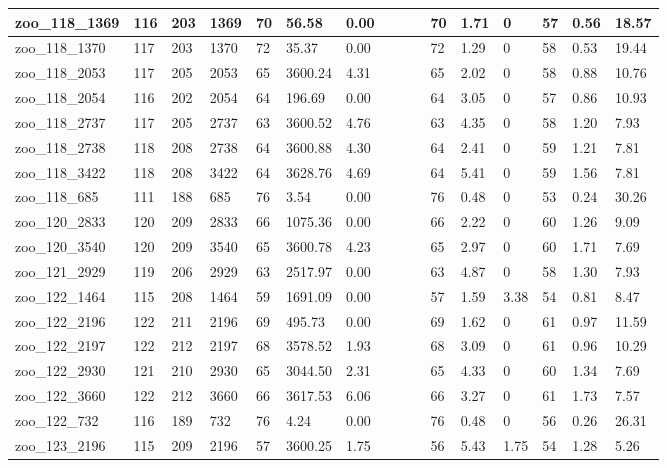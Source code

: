 \begin{landscape}
\begin{longtable}{llllllllllllllll}
zoo\_118\_1369 & 116 & 203 & 1369 & 70 & 56.58 & 0.00 &  &  &  & 70 & 1.71 & 0 & 57 & 0.56 & 18.57 \\ \hline 
zoo\_118\_1370 & 117 & 203 & 1370 & 72 & 35.37 & 0.00 &  &  &  & 72 & 1.29 & 0 & 58 & 0.53 & 19.44 \\ \hline 
zoo\_118\_2053 & 117 & 205 & 2053 & 65 & 3600.24 & 4.31 &  &  &  & 65 & 2.02 & 0 & 58 & 0.88 & 10.76 \\ \hline 
zoo\_118\_2054 & 116 & 202 & 2054 & 64 & 196.69 & 0.00 &  &  &  & 64 & 3.05 & 0 & 57 & 0.86 & 10.93 \\ \hline 
zoo\_118\_2737 & 117 & 205 & 2737 & 63 & 3600.52 & 4.76 &  &  &  & 63 & 4.35 & 0 & 58 & 1.20 & 7.93 \\ \hline 
zoo\_118\_2738 & 118 & 208 & 2738 & 64 & 3600.88 & 4.30 &  &  &  & 64 & 2.41 & 0 & 59 & 1.21 & 7.81 \\ \hline 
zoo\_118\_3422 & 118 & 208 & 3422 & 64 & 3628.76 & 4.69 &  &  &  & 64 & 5.41 & 0 & 59 & 1.56 & 7.81 \\ \hline 
zoo\_118\_685 & 111 & 188 & 685 & 76 & 3.54 & 0.00 &  &  &  & 76 & 0.48 & 0 & 53 & 0.24 & 30.26 \\ \hline 
zoo\_120\_2833 & 120 & 209 & 2833 & 66 & 1075.36 & 0.00 &  &  &  & 66 & 2.22 & 0 & 60 & 1.26 & 9.09 \\ \hline 
zoo\_120\_3540 & 120 & 209 & 3540 & 65 & 3600.78 & 4.23 &  &  &  & 65 & 2.97 & 0 & 60 & 1.71 & 7.69 \\ \hline 
zoo\_121\_2929 & 119 & 206 & 2929 & 63 & 2517.97 & 0.00 &  &  &  & 63 & 4.87 & 0 & 58 & 1.30 & 7.93 \\ \hline 
zoo\_122\_1464 & 115 & 208 & 1464 & 59 & 1691.09 & 0.00 &  &  &  & 57 & 1.59 & 3.38 & 54 & 0.81 & 8.47 \\ \hline 
zoo\_122\_2196 & 122 & 211 & 2196 & 69 & 495.73 & 0.00 &  &  &  & 69 & 1.62 & 0 & 61 & 0.97 & 11.59 \\ \hline 
zoo\_122\_2197 & 122 & 212 & 2197 & 68 & 3578.52 & 1.93 &  &  &  & 68 & 3.09 & 0 & 61 & 0.96 & 10.29 \\ \hline 
zoo\_122\_2930 & 121 & 210 & 2930 & 65 & 3044.50 & 2.31 &  &  &  & 65 & 4.33 & 0 & 60 & 1.34 & 7.69 \\ \hline 
zoo\_122\_3660 & 122 & 212 & 3660 & 66 & 3617.53 & 6.06 &  &  &  & 66 & 3.27 & 0 & 61 & 1.73 & 7.57 \\ \hline 
zoo\_122\_732 & 116 & 189 & 732 & 76 & 4.24 & 0.00 &  &  &  & 76 & 0.48 & 0 & 56 & 0.26 & 26.31 \\ \hline 
zoo\_123\_2196 & 115 & 209 & 2196 & 57 & 3600.25 & 1.75 &  &  &  & 56 & 5.43 & 1.75 & 54 & 1.28 & 5.26 \\ \hline 

\end{longtable}
\end{landscape}

